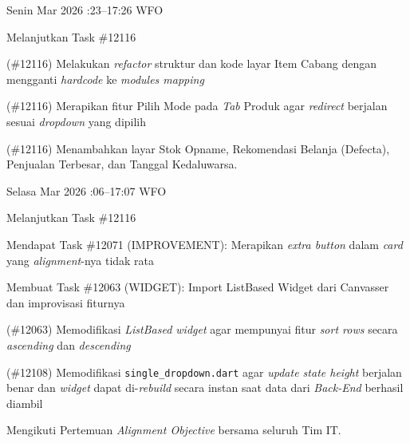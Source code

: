 \renewcommand{\reportmonth}{Maret}
\renewcommand{\signaturedate}{1 April 2026}

\begin{logtable}

    {
        Senin  Mar 2026 :23--17:26 \linebreak
        WFO
    }{
        \begin{loglist}
            \item Melanjutkan Task \#12116
        \end{loglist}
    }{
        \begin{logwork}
            \item (\#12116) Melakukan \textit{refactor} struktur dan kode layar Item Cabang dengan mengganti \textit{hardcode} ke \textit{modules mapping}
            \item (\#12116) Merapikan fitur Pilih Mode pada \textit{Tab} Produk agar \textit{redirect} berjalan sesuai \textit{dropdown} yang dipilih
            \item (\#12116) Menambahkan layar Stok Opname, Rekomendasi Belanja (Defecta), Penjualan Terbesar, dan Tanggal Kedaluwarsa.
        \end{logwork}
    }

    {
        Selasa  Mar 2026 :06--17:07 \linebreak
        WFO
    }{
        \begin{loglist}
            \item Melanjutkan Task \#12116
            \item Mendapat Task \#12071 (IMPROVEMENT): Merapikan \textit{extra button} dalam
            \textit{card} yang \textit{alignment}-nya tidak rata
            \item Membuat Task \#12063 (WIDGET): Import ListBased Widget dari Canvasser dan
            improvisasi fiturnya
        \end{loglist}
    }{
        \begin{logwork}
            \item (\#12063) Memodifikasi \textit{ListBased widget} agar mempunyai fitur \textit{sort rows} secara \textit{ascending} dan \textit{descending}
            \item (\#12108) Memodifikasi \texttt{single\_dropdown.dart} agar \textit{update state height} berjalan benar dan \textit{widget} dapat di-\textit{rebuild} secara instan saat data dari \textit{Back-End} berhasil diambil
            \item Mengikuti Pertemuan \textit{Alignment Objective} bersama seluruh Tim IT.
        \end{logwork}
    }


\end{logtable}
